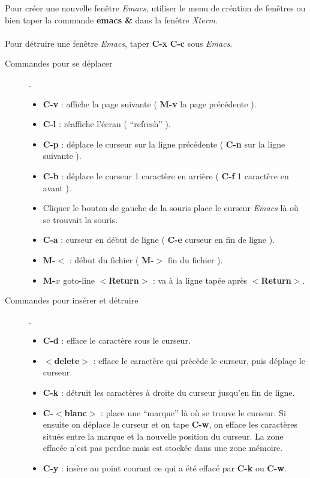 Pour cr\'eer une nouvelle fen\^etre {\em Emacs}, utiliser le menu de
 cr\'eation de fen\^etres ou bien taper la commande {\bf emacs \&} 
dans la fen\^etre {\em Xterm}.

\paragraph{}Pour d\'etruire une fen\^etre {\em Emacs}, 
taper {\bf C-x} {\bf C-c} sous {\em Emacs}.


\begin{description}


\item[Commandes pour se d\'eplacer] .

\begin{itemize}
\item  {\bf C-v} : affiche la page suivante 
( {\bf M-v} la page pr\'ec\'edente ).
\item  {\bf C-l}	: r\'eaffiche l'\'ecran ( ``refresh'' ).
\item  {\bf C-p}   :    d\'eplace le curseur sur la ligne pr\'ec\'edente
( {\bf C-n} sur la ligne suivante ).
\item  {\bf C-b}  :     d\'eplace le curseur 1 caract\`ere en arri\`ere
( {\bf C-f} 1 caract\`ere en avant ).
\item   Cliquer le bouton de gauche de la souris place le curseur {\em Emacs} 
	l\`a o\`u se trouvait la souris.
\item  {\bf C-a} :    curseur en d\'ebut de ligne 
( {\bf C-e} curseur en fin de ligne ).
\item  {\bf M-$<$}  :   d\'ebut du fichier 
( {\bf M-$>$} fin du fichier ).
\item  {\bf M-$x$} goto-line $<${\bf Return}$>$ : va \`a la ligne tap\'ee
apr\`es $<${\bf Return}$>$. 
\end{itemize}

\item[Commandes pour ins\'erer et d\'etruire] .

\begin{itemize}
\item  {\bf C-d} : efface le caract\`ere sous le curseur.
\item  {\bf $<$delete$>$} : efface le caract\`ere qui pr\'ec\`ede 
 le curseur, puis d\'epla\c{c}e le curseur.
\item  {\bf C-k}   : d\'etruit les caract\`eres \`a droite du curseur 
jusqu'en fin de ligne.
\item  {\bf C-$<$blanc$>$} : place une ``marque'' l\`a o\`u se trouve le 
curseur. Si ensuite on d\'eplace le curseur et on tape {\bf C-w}, on
efface les caract\`eres situ\'es entre la marque et la nouvelle position du
curseur. La zone effac\'ee n'est pas perdue mais est stock\'ee dans
une zone m\'emoire.
\item   {\bf C-y} : ins\`ere au point courant ce qui a \'et\'e effac\'e par 
{\bf C-k} ou {\bf C-w}.
\end{itemize}



\end{description}

